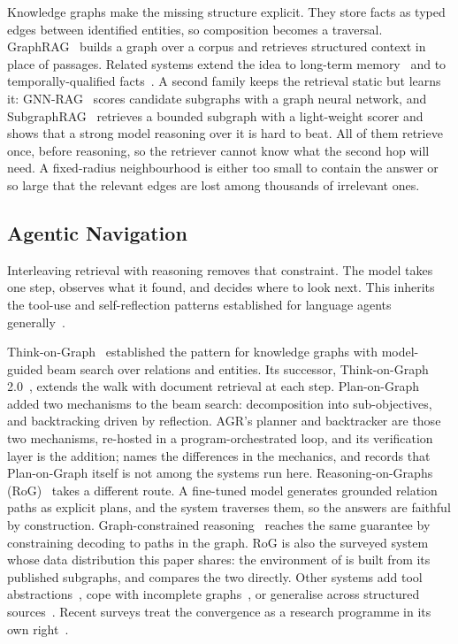 Knowledge graphs make the missing structure explicit. They store facts
as typed edges between identified entities, so composition becomes a
traversal. GraphRAG~\cite{edge2024local} builds a graph over a corpus
and retrieves structured context in place of passages. Related systems
extend the idea to long-term memory~\cite{gutierrez2024hipporag} and to
temporally-qualified facts~\cite{li2025tgrag}. A second family keeps the
retrieval static but learns it: GNN-RAG~\cite{mavromatis2024gnnrag}
scores candidate subgraphs with a graph neural network, and
SubgraphRAG~\cite{li2025subgraphrag} retrieves a bounded subgraph with a
light-weight scorer and shows that a strong model reasoning over it is
hard to beat. All of them retrieve once, before reasoning, so the
retriever cannot know what the second hop will need. A fixed-radius
neighbourhood is either too small to contain the answer or so large that
the relevant edges are lost among thousands of irrelevant ones.

\subsection{Agentic Navigation}\label{sec:rel-agentic}

Interleaving retrieval with reasoning removes that constraint. The model
takes one step, observes what it found, and decides where to look next.
This inherits the tool-use and self-reflection patterns established for
language agents
generally~\cite{yao2023react,schick2023toolformer,shinn2023reflexion}.

Think-on-Graph~\cite{sun2024think} established the pattern for knowledge
graphs with model-guided beam search over relations and entities. Its
successor, Think-on-Graph 2.0~\cite{ma2024tog2}, extends the walk with
document retrieval at each step. Plan-on-Graph~\cite{chen2024plan} added
two mechanisms to the beam search: decomposition into sub-objectives,
and backtracking driven by reflection. AGR's planner and backtracker are
those two mechanisms, re-hosted in a program-orchestrated loop, and its
verification layer is the addition;  names the
differences in the mechanics, and  records
that Plan-on-Graph itself is not among the systems run here.
Reasoning-on-Graphs (RoG)~\cite{luo2024reasoning} takes a different
route. A fine-tuned model generates grounded relation paths as explicit
plans, and the system traverses them, so the answers are faithful by
construction. Graph-constrained reasoning~\cite{luo2025gcr} reaches the
same guarantee by constraining decoding to paths in the graph. RoG is
also the surveyed system whose data distribution this paper shares: the
environment of  is built from its published
subgraphs, and  compares the two directly. Other systems
add tool abstractions~\cite{jiang2024kgagent}, cope with incomplete
graphs~\cite{xu2024generate}, or generalise across structured
sources~\cite{jiang2023structgpt}. Recent surveys treat the convergence
as a research programme in its own
right~\cite{pan2024unifying,ma2025unifying}.

